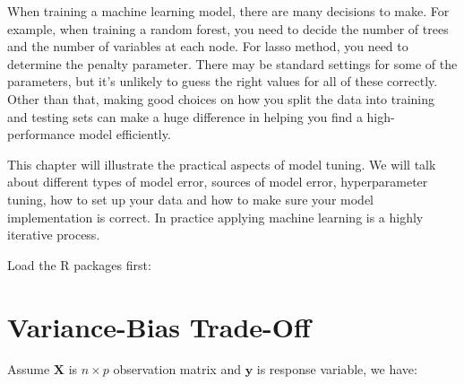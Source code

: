 \documentclass[12pt,]{krantz}
\makeatletter
\newenvironment{Shaded}{\begin{snugshade}}{\end{snugshade}}
\newcommand{\CommentTok}[1]{\textcolor[rgb]{0.37,0.37,0.37}{\textit{#1}}}
\newcommand{\ControlFlowTok}[1]{\textcolor[rgb]{0.27,0.27,0.27}{\textbf{#1}}}
\newcommand{\DataTypeTok}[1]{\textcolor[rgb]{0.27,0.27,0.27}{#1}}
\newcommand{\DecValTok}[1]{\textcolor[rgb]{0.06,0.06,0.06}{#1}}
\newcommand{\KeywordTok}[1]{\textcolor[rgb]{0.27,0.27,0.27}{\textbf{#1}}}
\newcommand{\NormalTok}[1]{#1}
\newcommand{\OperatorTok}[1]{\textcolor[rgb]{0.43,0.43,0.43}{\textbf{#1}}}
\newcommand{\OtherTok}[1]{\textcolor[rgb]{0.37,0.37,0.37}{#1}}
\newcommand{\StringTok}[1]{\textcolor[rgb]{0.5,0.5,0.5}{#1}}
\newenvironment{kframe}{%
\medskip{}
\setlength{\fboxsep}{.8em}
 \def\at@end@of@kframe{}%
 \ifinner\ifhmode%
  \def\at@end@of@kframe{\end{minipage}}%
  \begin{minipage}{\columnwidth}%
 \fi\fi%
 \def\FrameCommand##1{\hskip\@totalleftmargin \hskip-\fboxsep
 \colorbox{shadecolor}{##1}\hskip-\fboxsep
     \hskip-\linewidth \hskip-\@totalleftmargin \hskip\columnwidth}%
 \MakeFramed {\advance\hsize-\width
   \@totalleftmargin\z@ \linewidth\hsize
   \@setminipage}}%
 {\par\unskip\endMakeFramed%
 \at@end@of@kframe}
\renewenvironment{Shaded}{\begin{kframe}}{\end{kframe}}
\makeatother
\begin{document}
When training a machine learning model, there are many decisions to make. For example, when training a random forest, you need to decide the number of trees and the number of variables at each node. For lasso method, you need to determine the penalty parameter. There may be standard settings for some of the parameters, but it's unlikely to guess the right values for all of these correctly. Other than that, making good choices on how you split the data into training and testing sets can make a huge difference in helping you find a high-performance model efficiently.

This chapter will illustrate the practical aspects of model tuning. We will talk about different types of model error, sources of model error, hyperparameter tuning, how to set up your data and how to make sure your model implementation is correct. In practice applying machine learning is a highly iterative process.

Load the R packages first:

\begin{Shaded}
\end{Shaded}

\hypertarget{vbtradeoff}{%
\section{Variance-Bias Trade-Off}\label{vbtradeoff}}

Assume \(\mathbf{X}\) is \(n \times p\) observation matrix and \(\mathbf{y}\) is response variable, we have:
\end{document}
